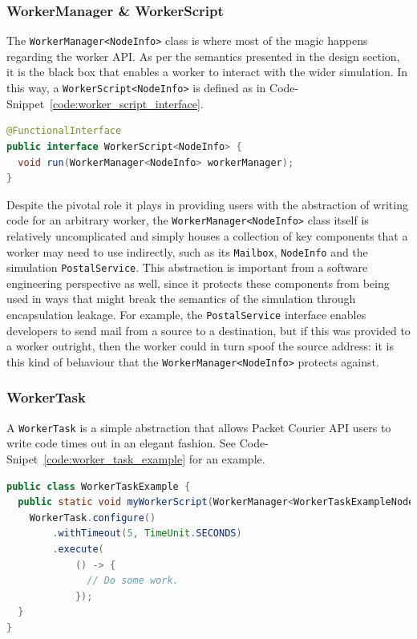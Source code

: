 \subsubsection{WorkerManager \& WorkerScript}\label{subsubsection:worker_manager_and_worker_script}

The \texttt{WorkerManager<NodeInfo>} class is where most of the magic happens regarding the worker API. As per the
semantics presented in the design section, it is the black box that enables a worker to interact with the wider
simulation. In this way, a \texttt{WorkerScript<NodeInfo>} is defined as in
Code-Snippet~\ref{code:worker_script_interface}.
\begin{lstlisting}[language=Java,caption={The \texttt{WorkerScript<NodeInfo>} interface exactly as it appears in the
codebase.},label={code:worker_script_interface},captionpos=b]
@FunctionalInterface
public interface WorkerScript<NodeInfo> {
  void run(WorkerManager<NodeInfo> workerManager);
}
\end{lstlisting}

Despite the pivotal role it plays in providing users with the abstraction of writing code for an arbitrary worker,
the \texttt{WorkerManager<NodeInfo>} class itself is relatively uncomplicated and simply houses a collection of key
components that a worker may need to use indirectly, such as its \texttt{Mailbox}, \texttt{NodeInfo} and the
simulation \texttt{PostalService}. This abstraction is important from a software engineering perspective as well,
since it protects these components from being used in ways that might break the semantics of the simulation through
encapsulation leakage. For example, the \texttt{PostalService} interface enables developers to send mail from a
source to a destination, but if this was provided to a worker outright, then the worker could in turn spoof the
source address: it is this kind of behaviour that the \texttt{WorkerManager<NodeInfo>} protects against.

\subsubsection{WorkerTask}\label{subsubsection:worker_task}

A \texttt{WorkerTask} is a simple abstraction that allows Packet Courier API users to write code times out in an
elegant fashion. See Code-Snipet~\ref{code:worker_task_example} for an example.
\begin{lstlisting}[language=Java,caption={An example of how \texttt{WorkerTask} might be used.},
    label={code:worker_task_example},captionpos=b]
public class WorkerTaskExample {
  public static void myWorkerScript(WorkerManager<WorkerTaskExampleNodeInfo> workerManager) {
    WorkerTask.configure()
        .withTimeout(5, TimeUnit.SECONDS)
        .execute(
            () -> {
              // Do some work.
            });
  }
}
\end{lstlisting}

